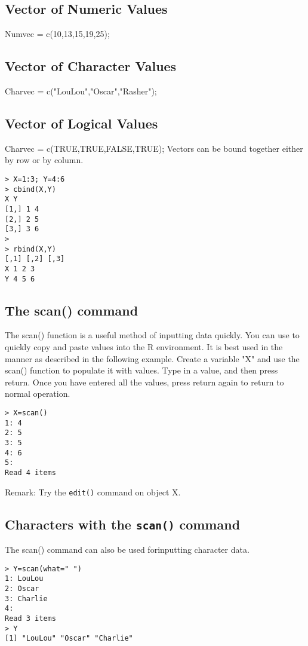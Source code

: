 \documentclass[a4paper,12pt]{article}
\begin{document}
\subsection*{ Vector of Numeric Values}
Numvec = c(10,13,15,19,25);

\subsection*{ Vector of Character Values}
Charvec = c("LouLou","Oscar","Rasher");


\subsection*{Vector of Logical Values}
Charvec = c(TRUE,TRUE,FALSE,TRUE);
Vectors can be bound together either by row or by column.
\begin{verbatim}
> X=1:3; Y=4:6
> cbind(X,Y)
X Y
[1,] 1 4
[2,] 2 5
[3,] 3 6
>
> rbind(X,Y)
[,1] [,2] [,3]
X 1 2 3
Y 4 5 6
\end{verbatim}
\subsection{The scan() command}
The scan() function is a useful method of inputting data quickly. You can use to quickly copy
and paste values into the R environment. It is best used in the manner as described in the
following example. Create a variable "X" and use the scan() function to populate it with
values. Type in a value, and then press return. Once you have entered all the values, press
return again to return to normal operation.
\begin{framed}
\begin{verbatim}
> X=scan()
1: 4
2: 5
3: 5
4: 6
5:
Read 4 items
\end{verbatim}
\end{framed}

Remark: Try the \texttt{edit()} command on object X.
\subsection*{Characters with the \texttt{scan()} command}
The scan() command can also be used forinputting character data.
\begin{verbatim}
> Y=scan(what=" ")
1: LouLou
2: Oscar
3: Charlie
4:
Read 3 items
> Y
[1] "LouLou" "Oscar" "Charlie"
\end{verbatim}
\end{document}
